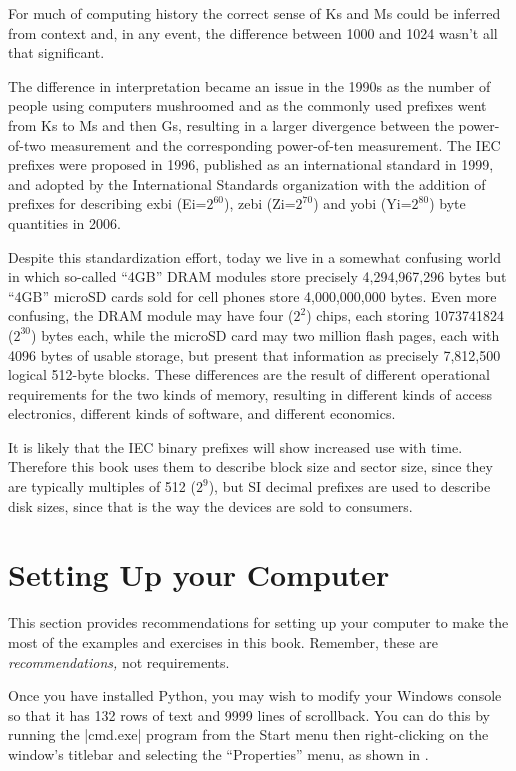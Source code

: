 For much of computing history the correct sense of Ks and Ms could be
inferred from context and, in any event, the difference between 1000
and 1024 wasn't all that significant.

The difference in interpretation became an issue in the 1990s as the
number of people using computers mushroomed and as the commonly used
prefixes went from Ks to Ms and then Gs, resulting in a larger
divergence between the power-of-two measurement and the corresponding
power-of-ten measurement. The IEC prefixes were proposed in
1996\cite{iec:1996},
published as an international standard in 1999, and adopted by the
International Standards organization with the addition of prefixes for
describing exbi (Ei=$2^{60}$), zebi (Zi=$2^{70}$) and yobi (Yi=$2^{80}$) byte
quantities in 2006\cite{iec:80000-13:2008}.  

Despite this standardization effort, today we live in a somewhat
confusing world in which so-called ``4GB'' DRAM modules 
store precisely 4,294,967,296 bytes
but ``4GB'' microSD cards sold for cell
phones store 4,000,000,000 bytes. Even more confusing, the DRAM
module may have four ($2^{2}$) chips, each storing 1073741824
($2^{30}$) bytes each, while the microSD card may two million flash
pages, each with 4096 bytes of usable storage, but present that
information as precisely 7,812,500 logical 512-byte blocks.  These
differences are the result of different operational requirements for
the two kinds of memory, resulting in different kinds of access
electronics, different kinds of software, and different economics. 

It is likely that the IEC binary prefixes will show increased use
with time. Therefore this book uses them to describe block size and
sector size, since they are typically multiples of 512 ($2^9$), but 
SI decimal prefixes are used to describe disk sizes, since that is the way
the devices are sold to consumers.


\section{Setting Up your Computer}
This section provides recommendations for setting up your computer to
make the most of the examples and exercises in this book. Remember,
these are \emph{recommendations,} not requirements.

Once you have installed Python, you may wish to modify your Windows
console so that it has 132 rows of text and 9999 lines of
scrollback. You can do this by running the |cmd.exe| program from the
Start menu then right-clicking on the window's titlebar and selecting
the ``Properties'' menu, as shown in .

